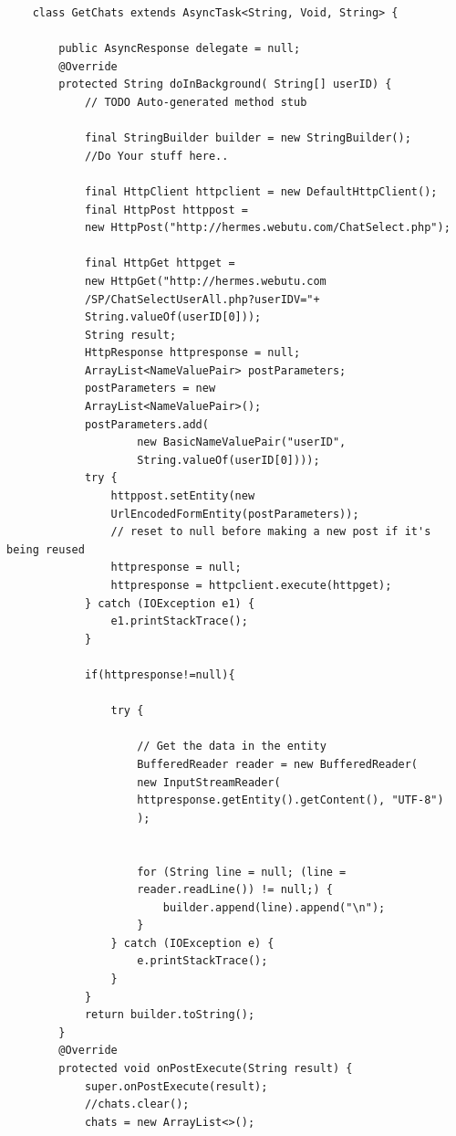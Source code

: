 \documentclass{article}
\begin{document}
\begin{lstlisting}
    class GetChats extends AsyncTask<String, Void, String> {

        public AsyncResponse delegate = null;
        @Override
        protected String doInBackground( String[] userID) {
            // TODO Auto-generated method stub

            final StringBuilder builder = new StringBuilder();
            //Do Your stuff here..

            final HttpClient httpclient = new DefaultHttpClient();
            final HttpPost httppost = 
            new HttpPost("http://hermes.webutu.com/ChatSelect.php");

            final HttpGet httpget = 
            new HttpGet("http://hermes.webutu.com
            /SP/ChatSelectUserAll.php?userIDV="+
            String.valueOf(userID[0]));
            String result;
            HttpResponse httpresponse = null;
            ArrayList<NameValuePair> postParameters;
            postParameters = new 
            ArrayList<NameValuePair>();
            postParameters.add(
                    new BasicNameValuePair("userID", 
                    String.valueOf(userID[0])));
            try {
                httppost.setEntity(new 
                UrlEncodedFormEntity(postParameters));
                // reset to null before making a new post if it's being reused
                httpresponse = null;
                httpresponse = httpclient.execute(httpget);
            } catch (IOException e1) {
                e1.printStackTrace();
            }

            if(httpresponse!=null){

                try {

                    // Get the data in the entity
                    BufferedReader reader = new BufferedReader(
                    new InputStreamReader(
                    httpresponse.getEntity().getContent(), "UTF-8")
                    );


                    for (String line = null; (line = 
                    reader.readLine()) != null;) {
                        builder.append(line).append("\n");
                    }
                } catch (IOException e) {
                    e.printStackTrace();
                }
            }
            return builder.toString();
        }
        @Override
        protected void onPostExecute(String result) {
            super.onPostExecute(result);
            //chats.clear();
            chats = new ArrayList<>();


\end{lstlisting}
\end{document}
